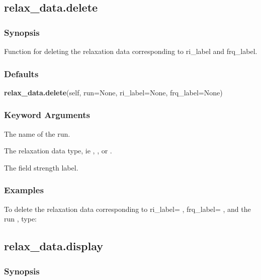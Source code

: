 \newpage

\subsection{relax\_data.delete}


\subsubsection{Synopsis}

Function for deleting the relaxation data corresponding to ri\_label and frq\_label.

\subsubsection{Defaults}

\textsf{\textbf{relax\_data.delete}(self, run=None, ri\_label=None, frq\_label=None)}


\subsubsection{Keyword Arguments}


  The name of the run.

  The relaxation  data type, ie 
, 
, or 
.

  The field strength label.

\subsubsection{Examples}

To delete  the relaxation  data corresponding to ri\_label=
, frq\_label=
, and the run
, type:




\newpage

\subsection{relax\_data.display}


\subsubsection{Synopsis}

